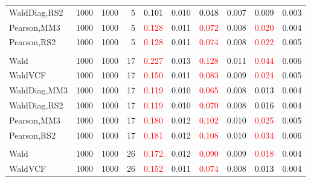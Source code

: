 \documentclass[
]{article}
\begin{document}
\begin{table}[H]
{\begin{tabular}[t]{lrrrrrrlrr}
\hspace{1em}WaldDiag,RS2 & 1000 & 1000 & 5 & \textcolor{black}{0.101} & 0.010 & \textcolor{black}{0.048} & 0.007 & \textcolor{black}{0.009} & 0.003\\
\hspace{1em}Pearson,MM3 & 1000 & 1000 & 5 & \textcolor{red}{0.128} & 0.011 & \textcolor{red}{0.072} & 0.008 & \textcolor{red}{0.020} & 0.004\\
\hspace{1em}Pearson,RS2 & 1000 & 1000 & 5 & \textcolor{red}{0.128} & 0.011 & \textcolor{red}{0.074} & 0.008 & \textcolor{red}{0.022} & 0.005\\
\addlinespace[0.3em]
\multicolumn{10}{l}{\textbf{1F 15V}}\\
\hspace{1em}Wald & 1000 & 1000 & 17 & \textcolor{red}{0.227} & 0.013 & \textcolor{red}{0.128} & 0.011 & \textcolor{red}{0.044} & 0.006\\
\hspace{1em}WaldVCF & 1000 & 1000 & 17 & \textcolor{red}{0.150} & 0.011 & \textcolor{red}{0.083} & 0.009 & \textcolor{red}{0.024} & 0.005\\
\hspace{1em}WaldDiag,MM3 & 1000 & 1000 & 17 & \textcolor{red}{0.119} & 0.010 & \textcolor{red}{0.065} & 0.008 & \textcolor{black}{0.013} & 0.004\\
\hspace{1em}WaldDiag,RS2 & 1000 & 1000 & 17 & \textcolor{red}{0.119} & 0.010 & \textcolor{red}{0.070} & 0.008 & \textcolor{black}{0.016} & 0.004\\
\hspace{1em}Pearson,MM3 & 1000 & 1000 & 17 & \textcolor{red}{0.180} & 0.012 & \textcolor{red}{0.102} & 0.010 & \textcolor{red}{0.025} & 0.005\\
\hspace{1em}Pearson,RS2 & 1000 & 1000 & 17 & \textcolor{red}{0.181} & 0.012 & \textcolor{red}{0.108} & 0.010 & \textcolor{red}{0.034} & 0.006\\
\addlinespace[0.3em]
\multicolumn{10}{l}{\textbf{2F 10V}}\\
\hspace{1em}Wald & 1000 & 1000 & 26 & \textcolor{red}{0.172} & 0.012 & \textcolor{red}{0.090} & 0.009 & \textcolor{red}{0.018} & 0.004\\
\hspace{1em}WaldVCF & 1000 & 1000 & 26 & \textcolor{red}{0.152} & 0.011 & \textcolor{red}{0.074} & 0.008 & \textcolor{black}{0.013} & 0.004\\

\end{tabular}}
\end{table}
\end{document}
